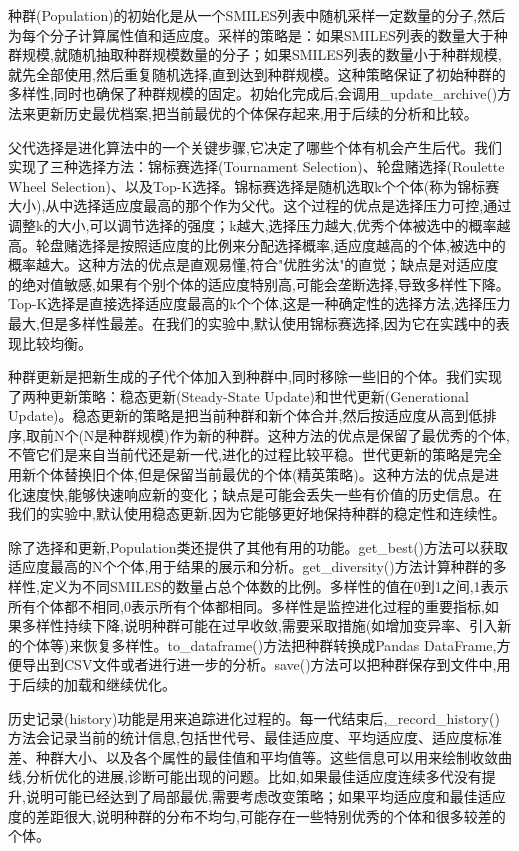种群(Population)的初始化是从一个SMILES列表中随机采样一定数量的分子,然后为每个分子计算属性值和适应度。采样的策略是：如果SMILES列表的数量大于种群规模,就随机抽取种群规模数量的分子；如果SMILES列表的数量小于种群规模,就先全部使用,然后重复随机选择,直到达到种群规模。这种策略保证了初始种群的多样性,同时也确保了种群规模的固定。初始化完成后,会调用\_update\_archive()方法来更新历史最优档案,把当前最优的个体保存起来,用于后续的分析和比较。

父代选择是进化算法中的一个关键步骤,它决定了哪些个体有机会产生后代。我们实现了三种选择方法：锦标赛选择(Tournament Selection)、轮盘赌选择(Roulette Wheel Selection)、以及Top-K选择。锦标赛选择是随机选取k个个体(称为锦标赛大小),从中选择适应度最高的那个作为父代。这个过程的优点是选择压力可控,通过调整k的大小,可以调节选择的强度；k越大,选择压力越大,优秀个体被选中的概率越高。轮盘赌选择是按照适应度的比例来分配选择概率,适应度越高的个体,被选中的概率越大。这种方法的优点是直观易懂,符合"优胜劣汰"的直觉；缺点是对适应度的绝对值敏感,如果有个别个体的适应度特别高,可能会垄断选择,导致多样性下降。Top-K选择是直接选择适应度最高的k个个体,这是一种确定性的选择方法,选择压力最大,但是多样性最差。在我们的实验中,默认使用锦标赛选择,因为它在实践中的表现比较均衡。

种群更新是把新生成的子代个体加入到种群中,同时移除一些旧的个体。我们实现了两种更新策略：稳态更新(Steady-State Update)和世代更新(Generational Update)。稳态更新的策略是把当前种群和新个体合并,然后按适应度从高到低排序,取前N个(N是种群规模)作为新的种群。这种方法的优点是保留了最优秀的个体,不管它们是来自当前代还是新一代,进化的过程比较平稳。世代更新的策略是完全用新个体替换旧个体,但是保留当前最优的个体(精英策略)。这种方法的优点是进化速度快,能够快速响应新的变化；缺点是可能会丢失一些有价值的历史信息。在我们的实验中,默认使用稳态更新,因为它能够更好地保持种群的稳定性和连续性。

除了选择和更新,Population类还提供了其他有用的功能。get\_best()方法可以获取适应度最高的N个个体,用于结果的展示和分析。get\_diversity()方法计算种群的多样性,定义为不同SMILES的数量占总个体数的比例。多样性的值在0到1之间,1表示所有个体都不相同,0表示所有个体都相同。多样性是监控进化过程的重要指标,如果多样性持续下降,说明种群可能在过早收敛,需要采取措施(如增加变异率、引入新的个体等)来恢复多样性。to\_dataframe()方法把种群转换成Pandas DataFrame,方便导出到CSV文件或者进行进一步的分析。save()方法可以把种群保存到文件中,用于后续的加载和继续优化。

历史记录(history)功能是用来追踪进化过程的。每一代结束后,\_record\_history()方法会记录当前的统计信息,包括世代号、最佳适应度、平均适应度、适应度标准差、种群大小、以及各个属性的最佳值和平均值等。这些信息可以用来绘制收敛曲线,分析优化的进展,诊断可能出现的问题。比如,如果最佳适应度连续多代没有提升,说明可能已经达到了局部最优,需要考虑改变策略；如果平均适应度和最佳适应度的差距很大,说明种群的分布不均匀,可能存在一些特别优秀的个体和很多较差的个体。

